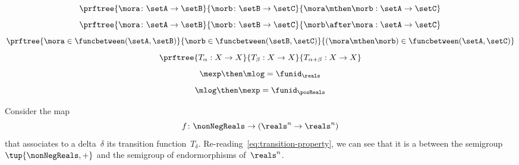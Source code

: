 {\begin{forslides}
\begin{equation}
			\label{eq:funccomp1}
			\prftree{\mora \colon \setA \to \setB}{\morb \colon \setB \to \setC}{\mora \mthen \morb : \setA \to \setC}
		\end{equation}
		\begin{equation}
			\label{eq:funccomp2}
			\prftree{\mora \colon \setA \to \setB}{\morb \colon \setB \to \setC}{\morb \after \mora : \setA \to \setC}
		\end{equation}
		\begin{equation}
			\label{eq:funccomp3}
			\prftree{%
				\mora \in \funcbetween(\setA, \setB)}{%
				\morb \in \funcbetween( \setB, \setC)}{
				(\mora \mthen \morb) \in \funcbetween( \setA, \setC)}
		\end{equation}
		\begin{equation}
			\label{eq:transitions}
			\prftree{T_\alpha: X \to X }{T_\beta : X \to X}{T_{\alpha+\beta} : X \to X}
		\end{equation}
		\begin{equation}
			\label{eq:explogid}
			\mexp \then \mlog = \funid_{\reals}
		\end{equation}
		\begin{equation}
			\label{eq:logexpid}
			\mlog \then \mexp = \funid_{\posReals}
		\end{equation}
	\end{forslides}
}%

\begin{example}
	Consider the map
	\begin{equation}
		f\colon \nonNegReals \to (\reals^n \to \reals^n)
	\end{equation}
	that associates to a delta~$\delta$ its transition function~$T_\delta$.
	Re-reading~\cref{eq:transition-property}, we can see that it is a \whomo between the semigroup~$\tup{\nonNegReals,+}$ and the semigroup of endormorphisms of~$\reals^n$.
\end{example}

